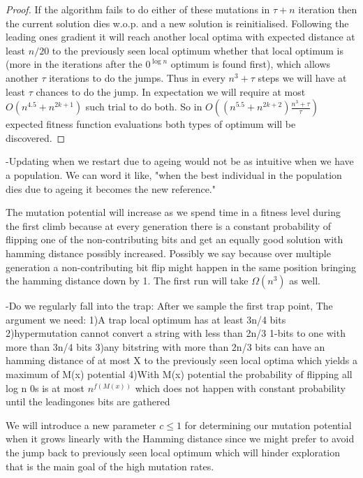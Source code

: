 \documentclass[lettersize,journal]{IEEEtran}
\begin{document}
{\begin{proof}
	 If the algorithm fails to do either of these mutations in $\tau + n$ iteration then the current solution dies w.o.p. and a new solution is reinitialised. Following the leading ones gradient it will reach another local optima with expected distance at least $n/20$ to the previously seen local optimum whether that local optimum is  (more in the iterations after the $0^{\log n}$ optimum is found first), which allows another $\tau$ iterations to do the jumps. Thus in every $n^3+\tau$ steps we will have at least $\tau$ chances to do the jump. In expectation we will require at most $O(n^{4.5} + n^{2k+1})$ such trial to do both. So in $O\left(\left(n^{5.5} + n^{2k+2}\right) \frac{n^3+\tau}{\tau}\right)$ expected fitness function evaluations both types of optimum will be discovered.
	 

 	

\end{proof} 

	 	-Updating when we restart due to ageing would not be as intuitive when we have a population. We can word it like, "when the best individual in the population dies due to ageing it becomes the new reference."
	 	
	 	The mutation potential will increase as we spend time in a fitness level during the first climb because at every generation there is a constant probability of flipping one of the non-contributing bits and get an equally good solution with hamming distance possibly increased. Possibly we say because over multiple generation a non-contributing bit flip might happen in the same position bringing the hamming distance down by 1. 
	 	The first run will take $\Omega(n^3)$ as well. 


		-Do we regularly fall into the trap: After we sample the first trap point, The argument we need:
		1)A trap local optimum has at least 3n/4 bits
		2)hypermutation cannot convert a string with less than 2n/3 1-bits to one with more than 3n/4 bits 
		3)any bitstring with more than 2n/3 bits can have an hamming distance of at most X to the previously seen local optima which yields a maximum of M(x) potential
		4)With M(x) potential the probability of flipping all log n 0s is at most $n^{f(M(x))}$ which does not happen with constant probability until the leadingones bits are gathered 

}

We will introduce a new parameter $c\leq 1$ for determining our mutation potential when it grows linearly with the Hamming distance since we might prefer to avoid the jump back to previously seen local optimum which will hinder exploration that is the main goal of the high mutation rates.
\end{document}
